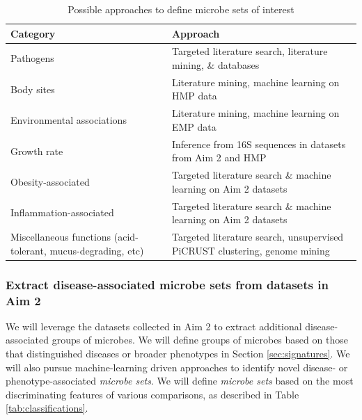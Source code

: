 \documentclass[12pt]{article}
\begin{document}
\begin{table}
\begin{tabular}{|p{6cm}|p{10cm}|}
	\hline
	\textbf{Category} & \textbf{Approach} \\
	\hline
	Pathogens & Targeted literature search, literature mining, \& 
	databases \\
	\hline
	Body sites & Literature mining, machine learning on HMP data \\
	\hline
	Environmental associations & Literature mining, machine learning 
	on EMP data \\
	\hline
	Growth rate & Inference from 16S sequences in datasets from Aim 2 
	and HMP \\
	\hline
	Obesity-associated & Targeted literature search \& machine 
	learning on Aim 2 datasets \\
	\hline
	Inflammation-associated & Targeted literature search \& machine 
	learning on Aim 2 datasets \\
	\hline
	Miscellaneous functions (acid-tolerant, mucus-degrading, etc) & 
	Targeted literature search, unsupervised PiCRUST clustering, 
	genome mining \\
	\hline 
\end{tabular}
\caption{Possible approaches to define microbe sets of interest}\label{tab:microbe_set_categories}
\end{table}


\subsubsection{Extract disease-associated microbe sets from datasets in Aim 2}
We will leverage the datasets collected in Aim 2 to extract additional 
disease-associated groups of microbes. We will define groups of 
microbes based on those that distinguished diseases or broader 
phenotypes in Section \ref{sec:signatures}. We will also pursue 
machine-learning driven approaches to identify novel disease- or 
phenotype-associated \textit{microbe sets}. We will define 
\textit{microbe sets} based on the most discriminating features of 
various comparisons, as described in Table \ref{tab:classifications}.
\end{document}
